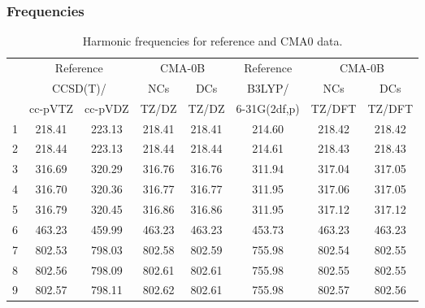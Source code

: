 \documentclass[10pt,oneside]{article}
\begin{document}
\clearpage

\subsubsection*{Frequencies}
\begin{table}[h!]
\centering
\caption{Harmonic frequencies for reference and CMA0 data.}
\begin{tabular}{cccccccc}
\toprule
{} & \multicolumn{2}{c}{Reference} & \multicolumn{2}{c}{CMA-0B} &    Reference & \multicolumn{2}{c}{CMA-0B} \\
{} & \multicolumn{2}{c}{CCSD(T)/} &    NCs &    DCs &       B3LYP/ &    NCs &    DCs \\
{} &   cc-pVTZ & cc-pVDZ &  TZ/DZ &  TZ/DZ & 6-31G(2df,p) & TZ/DFT & TZ/DFT \\
\midrule
1 &    218.41 &  223.13 & 218.41 & 218.41 &       214.60 & 218.42 & 218.42 \\
2 &    218.44 &  223.13 & 218.44 & 218.44 &       214.61 & 218.43 & 218.43 \\
3 &    316.69 &  320.29 & 316.76 & 316.76 &       311.94 & 317.04 & 317.05 \\
4 &    316.70 &  320.36 & 316.77 & 316.77 &       311.95 & 317.06 & 317.05 \\
5 &    316.79 &  320.45 & 316.86 & 316.86 &       311.95 & 317.12 & 317.12 \\
6 &    463.23 &  459.99 & 463.23 & 463.23 &       453.73 & 463.23 & 463.23 \\
7 &    802.53 &  798.03 & 802.58 & 802.59 &       755.98 & 802.54 & 802.55 \\
8 &    802.56 &  798.09 & 802.61 & 802.61 &       755.98 & 802.55 & 802.55 \\
9 &    802.57 &  798.11 & 802.62 & 802.61 &       755.98 & 802.57 & 802.56 \\
\bottomrule
\end{tabular}
\end{table}

\clearpage
\end{document}
